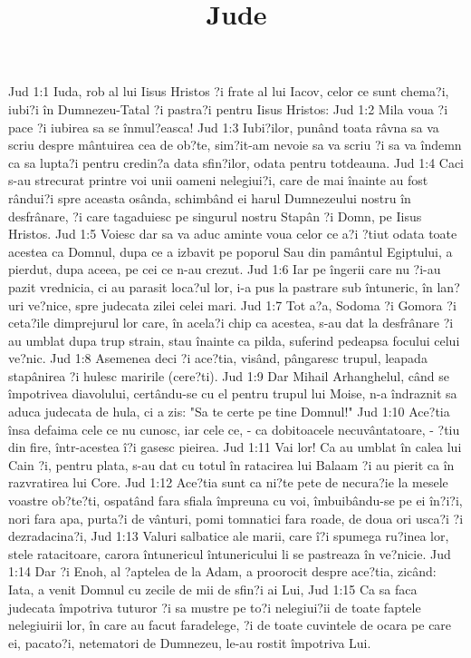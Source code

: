 

\title{Jude}

Jud 1:1  Iuda, rob al lui Iisus Hristos ?i frate al lui Iacov, celor ce sunt chema?i, iubi?i în Dumnezeu-Tatal ?i pastra?i pentru Iisus Hristos:
Jud 1:2  Mila voua ?i pace ?i iubirea sa se înmul?easca!
Jud 1:3  Iubi?ilor, punând toata râvna sa va scriu despre mântuirea cea de ob?te, sim?it-am nevoie sa va scriu ?i sa va îndemn ca sa lupta?i pentru credin?a data sfin?ilor, odata pentru totdeauna.
Jud 1:4  Caci s-au strecurat printre voi unii oameni nelegiui?i, care de mai înainte au fost rândui?i spre aceasta osânda, schimbând ei harul Dumnezeului nostru în desfrânare, ?i care tagaduiesc pe singurul nostru Stapân ?i Domn, pe Iisus Hristos.
Jud 1:5  Voiesc dar sa va aduc aminte voua celor ce a?i ?tiut odata toate acestea ca Domnul, dupa ce a izbavit pe poporul Sau din pamântul Egiptului, a pierdut, dupa aceea, pe cei ce n-au crezut.
Jud 1:6  Iar pe îngerii care nu ?i-au pazit vrednicia, ci au parasit loca?ul lor, i-a pus la pastrare sub întuneric, în lan?uri ve?nice, spre judecata zilei celei mari.
Jud 1:7  Tot a?a, Sodoma ?i Gomora ?i ceta?ile dimprejurul lor care, în acela?i chip ca acestea, s-au dat la desfrânare ?i au umblat dupa trup strain, stau înainte ca pilda, suferind pedeapsa focului celui ve?nic.
Jud 1:8  Asemenea deci ?i ace?tia, visând, pângaresc trupul, leapada stapânirea ?i hulesc maririle (cere?ti).
Jud 1:9  Dar Mihail Arhanghelul, când se împotrivea diavolului, certându-se cu el pentru trupul lui Moise, n-a îndraznit sa aduca judecata de hula, ci a zis: "Sa te certe pe tine Domnul!"
Jud 1:10  Ace?tia însa defaima cele ce nu cunosc, iar cele ce, - ca dobitoacele necuvântatoare, - ?tiu din fire, într-acestea î?i gasesc pieirea.
Jud 1:11  Vai lor! Ca au umblat în calea lui Cain ?i, pentru plata, s-au dat cu totul în ratacirea lui Balaam ?i au pierit ca în razvratirea lui Core.
Jud 1:12  Ace?tia sunt ca ni?te pete de necura?ie la mesele voastre ob?te?ti, ospatând fara sfiala împreuna cu voi, îmbuibându-se pe ei în?i?i, nori fara apa, purta?i de vânturi, pomi tomnatici fara roade, de doua ori usca?i ?i dezradacina?i,
Jud 1:13  Valuri salbatice ale marii, care î?i spumega ru?inea lor, stele ratacitoare, carora întunericul întunericului li se pastreaza în ve?nicie.
Jud 1:14  Dar ?i Enoh, al ?aptelea de la Adam, a proorocit despre ace?tia, zicând: Iata, a venit Domnul cu zecile de mii de sfin?i ai Lui,
Jud 1:15  Ca sa faca judecata împotriva tuturor ?i sa mustre pe to?i nelegiui?ii de toate faptele nelegiuirii lor, în care au facut faradelege, ?i de toate cuvintele de ocara pe care ei, pacato?i, netematori de Dumnezeu, le-au rostit împotriva Lui.
